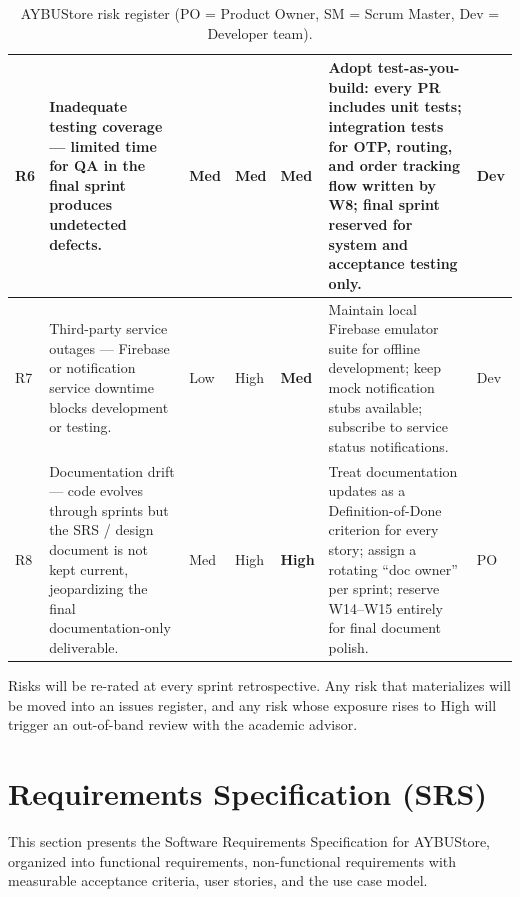 \documentclass[11pt,a4paper]{article}
\begin{document}
\begin{table}[H]
\begin{tabular}{|p{}|p{}|p{}|p{}|p{}|p{}|p{}|}
R6 & Inadequate testing coverage --- limited time for QA in the final
sprint produces undetected defects. & Med & Med &
\cellcolor{riskMed}\textbf{Med} & Adopt test-as-you-build: every PR
includes unit tests; integration tests for OTP, routing, and order
tracking flow written by W8; final sprint reserved for system and
acceptance testing only. & Dev \\ \hline

R7 & Third-party service outages --- Firebase or notification service
downtime blocks development or testing. & Low & High &
\cellcolor{riskMed}\textbf{Med} & Maintain local Firebase emulator
suite for offline development; keep mock notification stubs available;
subscribe to service status notifications. & Dev \\ \hline

R8 & Documentation drift --- code evolves through sprints but the SRS
/ design document is not kept current, jeopardizing the final
documentation-only deliverable. & Med & High &
\cellcolor{riskHigh}\textbf{High} & Treat documentation updates as a
Definition-of-Done criterion for every story; assign a rotating
``doc owner'' per sprint; reserve W14--W15 entirely for final document
polish. & PO \\ \hline
\end{tabular}
\caption{AYBUStore risk register
(PO = Product Owner, SM = Scrum Master, Dev = Developer team).}
\label{tab:risks}
\end{table}

\noindent
Risks will be re-rated at every sprint retrospective. Any risk that
materializes will be moved into an issues register, and any risk
whose exposure rises to High will trigger an out-of-band review with
the academic advisor.

\section{Requirements Specification (SRS)}
\label{sec:srs}
This section presents the Software Requirements Specification for AYBUStore, organized into functional requirements, non-functional requirements with measurable acceptance criteria, user stories, and the use case model.
\end{document}
